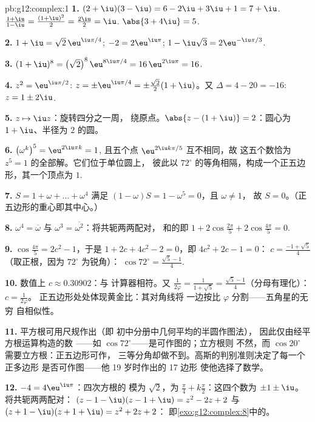 \begin{solution}{pb:g12:complex:1}
\textbf{1.} $(2 + \iu)(3 - \iu) = 6 - 2\iu + 3\iu + 1 =
7 + \iu$. \quad $\frac{1 + \iu}{1 - \iu} =
\frac{(1 + \iu)^2}{2} = \frac{2\iu}{2} = \iu$. \quad
$\abs{3 + 4\iu} = 5$.

\textbf{2.} $1 + \iu = \sqrt2\,\eu^{\iu\pi/4}$;
$-2 = 2\eu^{\iu\pi}$;
$1 - \iu\sqrt3 = 2\eu^{-\iu\pi/3}$.

\textbf{3.} $(1 + \iu)^8 = \left(\sqrt2\right)^8
\eu^{8\iu\pi/4} = 16\,\eu^{2\iu\pi} = 16$.

\textbf{4.} $z^2 = \eu^{\iu\pi/2}$:
$z = \pm\eu^{\iu\pi/4} = \pm\frac{\sqrt2}{2}(1 + \iu)$。又
$\Delta = 4 - 20 = -16$: $z = 1 \pm 2\iu$.

\textbf{5.} $z \mapsto \iu z$：旋转四分之一周，
绕原点。$\abs{z - (1 + \iu)} = 2$：圆心为
$1 + \iu$、半径为 $2$ 的圆。

\textbf{6.} $\left(\omega^k\right)^5 = \eu^{2\iu\pi k} = 1$,
且五个点 $\eu^{2\iu k\pi/5}$ 互不相同，故
这五个数恰为 $z^5 = 1$ 的全部解。它们位于单位圆上，
彼此以 $72^\circ$ 的等角相隔，构成一个正五边形，其一个顶点为
$1$.

\textbf{7.} $S = 1 + \omega + \dots + \omega^4$ 满足
$(1 - \omega)S = 1 - \omega^5 = 0$，且 $\omega \neq 1$，
故 $S = 0$。（正五边形的重心即其中心。）

\textbf{8.} $\omega^4 = \overline\omega$ 与
$\omega^3 = \overline{\omega^2}$：将共轭两两配对，
和的即
$1 + 2\cos\frac{2\pi}{5} + 2\cos\frac{4\pi}{5} = 0$.

\textbf{9.} $\cos\frac{4\pi}{5} = 2c^2 - 1$，于是
$1 + 2c + 4c^2 - 2 = 0$，即 $4c^2 + 2c - 1 = 0$：
$c = \frac{-1 + \sqrt5}{4}$（取正根，因为
$72^\circ$ 为锐角）：
$\cos 72^\circ = \frac{\sqrt5 - 1}{4}$.

\textbf{10.} 数值上 $c \approx 0.30902$：与
计算器相符。又 $\frac{1}{2\varphi} = \frac{1}{1 + \sqrt5} =
\frac{\sqrt5 - 1}{4}$（分母有理化）：$c = \frac{1}{2\varphi}$。
正五边形处处体现黄金比：其对角线将
一边按比 $\varphi$ 分割——五角星的无穷
自相似性。

\textbf{11.} 平方根可用尺规作出（即
初中分册中几何平均的半圆作图法），
因此仅由经平方根运算构造的数
——如 $\cos 72^\circ$——是可作图的；立方根则
不然，而 $\cos 20^\circ$ 需要立方根：正五边形可作，
三等分角却做不到。高斯的判别准则决定了每一个正多边形
是否可作图——他 19 岁时作出的 17 边形
使他选择了数学。

\textbf{12.} $-4 = 4\eu^{\iu\pi}$：四次方根的
模为 $\sqrt2$，为
$\frac{\pi}{4} + k\frac{\pi}{2}$：这四个数为
$\pm 1 \pm \iu$。将共轭两两配对：
$(z - 1 - \iu)(z - 1 + \iu) = z^2 - 2z + 2$ 与
$(z + 1 - \iu)(z + 1 + \iu) = z^2 + 2z + 2$：
即\cref{exo:g12:complex:8}中的。


\end{solution}
